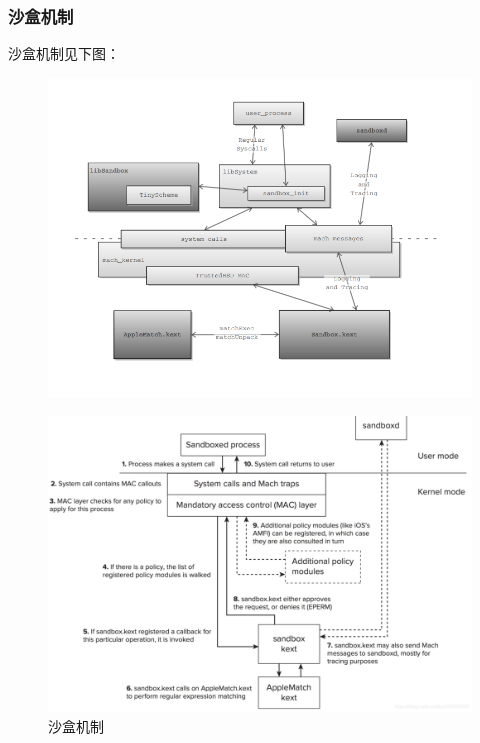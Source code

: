 \documentclass[AutoFakeBold,a4paper]{ctexart}
\begin{document}
\subsubsection{沙盒机制}

沙盒机制见下图：

\begin{figure}[H]
    \centering
    \includegraphics[width=0.92\columnwidth]{../feasibility/Sandbox_Structure.PNG}
\end{figure}

\begin{figure}[H]
    \centering
    \includegraphics[width=0.92\columnwidth]{../feasibility/Sandbox_Process.png}
    \caption{沙盒机制\cite{blazakis2011apple}}
\end{figure}
\end{document}
